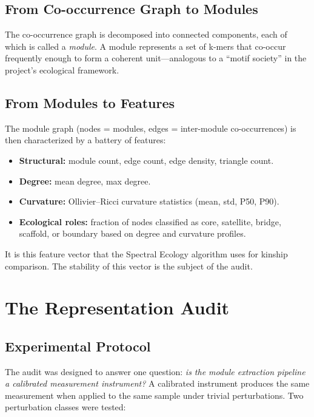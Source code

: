\documentclass{../yalumba}
\begin{document}
\subsection{From Co-occurrence Graph to Modules}

The co-occurrence graph is decomposed into connected components, each of which
is called a \textit{module}. A module represents a set of k-mers that
co-occur frequently enough to form a coherent unit---analogous to a ``motif
society'' in the project's ecological framework.

\subsection{From Modules to Features}

The module graph (nodes = modules, edges = inter-module co-occurrences) is then
characterized by a battery of features:
\begin{itemize}[leftmargin=2em]
  \item \textbf{Structural:} module count, edge count, edge density, triangle count.
  \item \textbf{Degree:} mean degree, max degree.
  \item \textbf{Curvature:} Ollivier--Ricci curvature statistics (mean, std, P50, P90).
  \item \textbf{Ecological roles:} fraction of nodes classified as core, satellite,
    bridge, scaffold, or boundary based on degree and curvature profiles.
\end{itemize}

It is this feature vector that the Spectral Ecology algorithm uses for kinship
comparison. The stability of this vector is the subject of the audit.


\section{The Representation Audit}
\label{sec:audit}

\subsection{Experimental Protocol}

The audit was designed to answer one question: \textit{is the module extraction
pipeline a calibrated measurement instrument?} A calibrated instrument produces
the same measurement when applied to the same sample under trivial perturbations.
Two perturbation classes were tested:
\end{document}
